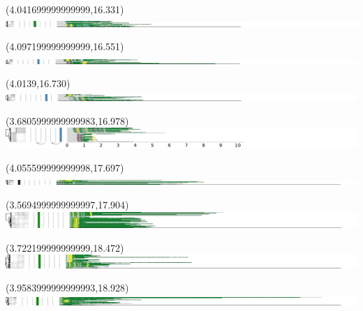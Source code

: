\documentclass{article}
\begin{document}
\begin{textblock}{13}(4.041699999999999,16.331)\includegraphics{latex/figures/haplotypes-constrained/chr11-HG004.pdf}\end{textblock}
\begin{textblock}{13}(4.097199999999999,16.551)\includegraphics{latex/figures/haplotypes-constrained/chr11-HG005.pdf}\end{textblock}
\begin{textblock}{13}(4.0139,16.730)\includegraphics{latex/figures/haplotypes-constrained/chr11-HG006.pdf}\end{textblock}
\begin{textblock}{13}(3.6805999999999983,16.978)\includegraphics{latex/figures/haplotypes-constrained/chr11-HG007.pdf}\end{textblock}
\begin{textblock}{13}(4.055599999999998,17.697)\includegraphics{latex/figures/haplotypes-constrained/chr12-HG001.pdf}\end{textblock}
\begin{textblock}{13}(3.5694999999999997,17.904)\includegraphics{latex/figures/haplotypes-constrained/chr12-HG002.pdf}\end{textblock}
\begin{textblock}{13}(3.722199999999999,18.472)\includegraphics{latex/figures/haplotypes-constrained/chr12-HG003.pdf}\end{textblock}
\begin{textblock}{13}(3.9583999999999993,18.928)\includegraphics{latex/figures/haplotypes-constrained/chr12-HG004.pdf}\end{textblock}
\end{document}
